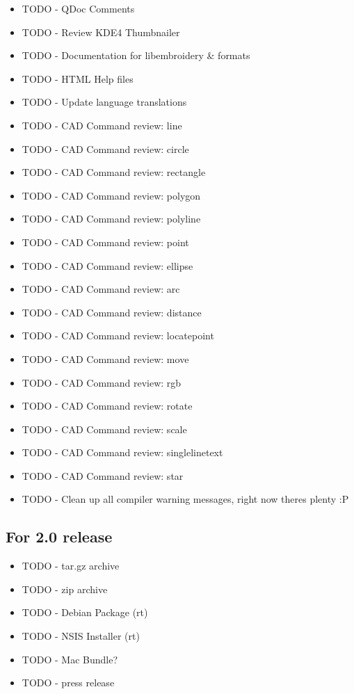 \documentclass{report}
\begin{document}
\begin{itemize}
\item TODO - QDoc Comments
\item TODO - Review KDE4 Thumbnailer
\item TODO - Documentation for libembroidery \& formats
\item TODO - HTML Help files
\item TODO - Update language translations
\item TODO - CAD Command review: line
\item TODO - CAD Command review: circle
\item TODO - CAD Command review: rectangle
\item TODO - CAD Command review: polygon
\item TODO - CAD Command review: polyline
\item TODO - CAD Command review: point
\item TODO - CAD Command review: ellipse
\item TODO - CAD Command review: arc
\item TODO - CAD Command review: distance
\item TODO - CAD Command review: locatepoint
\item TODO - CAD Command review: move
\item TODO - CAD Command review: rgb
\item TODO - CAD Command review: rotate
\item TODO - CAD Command review: scale
\item TODO - CAD Command review: singlelinetext
\item TODO - CAD Command review: star
\item TODO - Clean up all compiler warning messages, right now theres plenty :P
\end{itemize}

\subsection{For 2.0 release}

\begin{itemize}
\item TODO - tar.gz archive
\item TODO - zip archive
\item TODO - Debian Package (rt)
\item TODO - NSIS Installer (rt)
\item TODO - Mac Bundle?
\item TODO - press release
\end{itemize}
\end{document}
